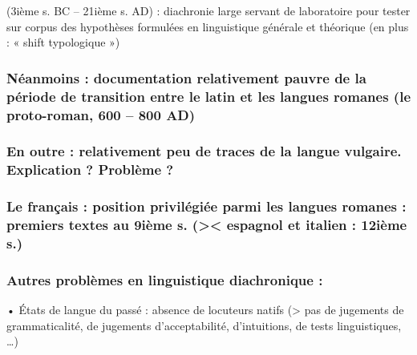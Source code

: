 \documentclass[
  letterpaper,
]{scrbook}
\begin{document}
(3ième s. BC -- 21ième s. AD) : diachronie large servant de laboratoire
pour tester sur corpus des hypothèses formulées en linguistique générale
et théorique (en plus : « shift typologique »)

\hypertarget{nuxe9anmoins-documentation-relativement-pauvre-de-la-puxe9riode-de-transition-entre-le-latin-et-les-langues-romanes-le-proto-roman-600-800-ad}{%
\subsubsection{Néanmoins : documentation relativement pauvre de la
période de transition entre le latin et les langues romanes (le
proto-roman, 600 -- 800
AD)}\label{nuxe9anmoins-documentation-relativement-pauvre-de-la-puxe9riode-de-transition-entre-le-latin-et-les-langues-romanes-le-proto-roman-600-800-ad}}

\hypertarget{en-outre-relativement-peu-de-traces-de-la-langue-vulgaire.-explication-probluxe8me}{%
\subsubsection{En outre : relativement peu de traces de la langue
vulgaire. Explication ? Problème
?}\label{en-outre-relativement-peu-de-traces-de-la-langue-vulgaire.-explication-probluxe8me}}

\hypertarget{le-franuxe7ais-position-priviluxe9giuxe9e-parmi-les-langues-romanes-premiers-textes-au-9iuxe8me-s.-espagnol-et-italien-12iuxe8me-s.}{%
\subsubsection{Le français : position privilégiée parmi les langues
romanes : premiers textes au 9ième s. (\textgreater\textless{} espagnol
et italien : 12ième
s.)}\label{le-franuxe7ais-position-priviluxe9giuxe9e-parmi-les-langues-romanes-premiers-textes-au-9iuxe8me-s.-espagnol-et-italien-12iuxe8me-s.}}

\hypertarget{autres-probluxe8mes-en-linguistique-diachronique}{%
\subsubsection{Autres problèmes en linguistique diachronique
:}\label{autres-probluxe8mes-en-linguistique-diachronique}}

• États de langue du passé : absence de locuteurs natifs (\textgreater{}
pas de jugements de grammaticalité, de jugements d'acceptabilité,
d'intuitions, de tests linguistiques, \ldots)
\end{document}
